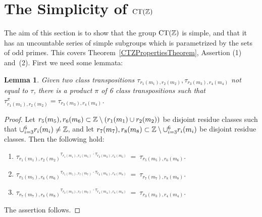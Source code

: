 \documentclass{amsart}
\theoremstyle{definition} \newtheorem{CTZDefinition}{Definition}[section]
\theoremstyle{plain}      \newtheorem{CTZPropertiesTheorem}[CTZDefinition]{Theorem}
\theoremstyle{plain}      \newtheorem{CTZSubgroupsTheorem}[CTZDefinition]{Theorem}
\theoremstyle{definition} \newtheorem{RcwaMappingDefinition}{Definition}[section]
\theoremstyle{definition} \newtheorem{RCWADefinition}[RcwaMappingDefinition]{Definition}
\theoremstyle{plain}      \newtheorem{CTZNotFinitelyGeneratedTheorem}
\theoremstyle{definition} \newtheorem{CTZSmEmbeddingDefinition}[RcwaMappingDefinition]{Definition}
\theoremstyle{plain}      \newtheorem{CTZHighlyTransitiveTheorem}[RcwaMappingDefinition]{Theorem}
\theoremstyle{plain}      \newtheorem{CTZTorsionElementsDivisibleTheorem}
\theoremstyle{plain}      \newtheorem{CTLemma}{Lemma}[section]
\theoremstyle{plain}      \newtheorem{IntegralCommutatorLemma}[CTLemma]{Lemma}
\theoremstyle{plain}      \newtheorem{NormalSubgroupContainsIntegralElementLemma}[CTLemma]{Lemma}
\theoremstyle{plain}      \newtheorem{CTZSimpleTheorem}[CTLemma]{Theorem}
\theoremstyle{remark}     \newtheorem{CTZSimpleRemark}[CTLemma]{Remark}
\theoremstyle{definition} \newtheorem{CTPZDefinition}[CTLemma]{Definition}
\theoremstyle{plain}      \newtheorem{CTPZSimpleCorollary}[CTLemma]{Corollary}
\theoremstyle{plain}      \newtheorem{CTPZSimpleProblem}[CTLemma]{Problem}
\theoremstyle{plain}      \newtheorem{FnPSL2ZEmbeddingTheorem}{Theorem}[section]
\theoremstyle{plain}      \newtheorem{FreeProductEmbeddingTheorem}[FnPSL2ZEmbeddingTheorem]{Theorem}
\theoremstyle{definition} \newtheorem{RestrictionMonomorphismDefinition}
\theoremstyle{plain}      \newtheorem{DirectAndWreathProductsEmbeddingTheorem}
\theoremstyle{plain}      \newtheorem{DirectAndWreathProductsEmbeddingCorollary}
\theoremstyle{definition} \newtheorem{CTintZDefinition}[FnPSL2ZEmbeddingTheorem]{Definition}
\theoremstyle{plain}      \newtheorem{CTintZSimpleTheorem}[FnPSL2ZEmbeddingTheorem]{Theorem}
\theoremstyle{definition} \newtheorem{KernelDefinition}{Definition}[section]
\theoremstyle{definition} \newtheorem{TameWildDefinition}[KernelDefinition]{Definition}
\theoremstyle{definition} \newtheorem{SimpleSupergroupsDefinition}[KernelDefinition]{Definition}
\theoremstyle{definition} \newtheorem{CSCRDefinition}[KernelDefinition]{Definition}
\theoremstyle{plain}      \newtheorem{SimpleSupergroupsGeneratorsTheorem}[KernelDefinition]{Theorem}
\theoremstyle{plain}      \newtheorem{SimpleSupergroupsTheorem}[KernelDefinition]{Theorem}
\theoremstyle{plain}      \newtheorem{SimpleSupergroupsTransitivityTheorem}
\theoremstyle{plain}      \newtheorem{TameGenerationConjecture}[KernelDefinition]{Conjecture}
\theoremstyle{remark}     \newtheorem{TameGenerationRemark}[KernelDefinition]{Remark}
\begin{document}
\section{The Simplicity of \(\CT{\ZZ}\)} \label{CTZSimpleSection}

The aim of this section is to show that the group \(\CT{\ZZ}\) is simple, and that it has
an uncountable series of simple subgroups which is parametrized by the sets of odd primes.
This covers Theorem~\ref{CTZPropertiesTheorem}, Assertion (1) and~(2).
First we need some lemmata:

\begin{CTLemma} \label{CTLemma}
  Given two class transpositions \(\tau_{r_1(m_1),r_2(m_2)}, \tau_{r_3(m_3),r_4(m_4)}\)
  not equal to \(\tau\), there is a product \(\pi\) of 6 class transpositions such that
  \(\tau_{r_1(m_1),r_2(m_2)}^\pi = \tau_{r_3(m_3),r_4(m_4)}\).
\end{CTLemma}
\begin{proof}
  Let \(r_5(m_5), r_6(m_6) \subset \mathbb{Z} \setminus (r_1(m_1) \cup r_2(m_2))\) be disjoint residue
  classes such that \(\cup_{i=3}^6 r_i(m_i) \neq \mathbb{Z}\), and let
  \(r_7(m_7), r_8(m_8) \subset \mathbb{Z} \setminus \cup_{i=3}^6 r_i(m_i)\) be disjoint
  residue classes. Then the following hold:
  \begin{enumerate}

    \item \({\tau_{r_1(m_1),r_2(m_2)}}^{\displaystyle{       \tau_{r_1(m_1),r_5(m_5)}
                                                       \cdot \tau_{r_2(m_2),r_6(m_6)}}}
             \ = \ \tau_{r_5(m_5),r_6(m_6)}\).

    \item \({\tau_{r_5(m_5),r_6(m_6)}}^{\displaystyle{       \tau_{r_5(m_5),r_7(m_7)}
                                                       \cdot \tau_{r_6(m_6),r_8(m_8)}}}
             \ = \ \tau_{r_7(m_7),r_8(m_8)}\).

    \item \({\tau_{r_7(m_7),r_8(m_8)}}^{\displaystyle{       \tau_{r_3(m_3),r_7(m_7)}
                                                       \cdot \tau_{r_4(m_4),r_8(m_8)}}}
             \ = \ \tau_{r_3(m_3),r_4(m_4)}\).

  \end{enumerate}
  The assertion follows.
\end{proof}
\end{document}
